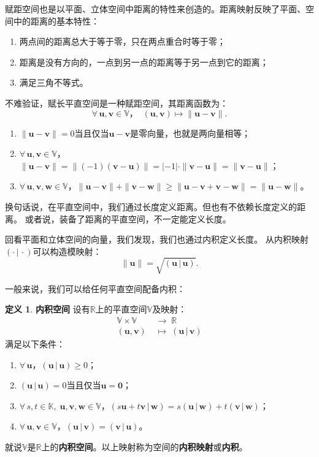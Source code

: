 \documentclass[12pt,UTF8]{ctexbook}
\newcommand{\nji}[2]{\displaystyle\left( #1 \,|\, #2\right)}
\theoremstyle{definition}
\newtheorem{df}{定义}[section]
\theoremstyle{plain}
\begin{document}
赋距空间也是以平面、立体空间中距离的特性来创造的。距离映射反映了平面、空间中的距离的基本特性：
\begin{enumerate}
    \item 两点间的距离总大于等于零，只在两点重合时等于零；
    \item 距离是没有方向的，一点到另一点的距离等于另一点到它的距离；
    \item 满足三角不等式。
\end{enumerate}

不难验证，赋长平直空间是一种赋距空间，其距离函数为：
$$ \forall \, \mathbf{u}, \mathbf{v} \in \mathbb{V}，\;\; (\mathbf{u}, \mathbf{v}) \mapsto \| \mathbf{u} - \mathbf{v} \|.$$
\begin{enumerate}
    \item $\| \mathbf{u} - \mathbf{v} \| = 0$当且仅当$\mathbf{u} - \mathbf{v}$是零向量，也就是两向量相等；
    \item $\forall \, \mathbf{u}, \mathbf{v} \in \mathbb{V}$，$\| \mathbf{u} - \mathbf{v} \| = \| (-1) (\mathbf{v} - \mathbf{u}) \| = |-1|\cdot \| \mathbf{v} - \mathbf{u} \| = \| \mathbf{v} - \mathbf{u} \|$；
    \item $\forall \, \mathbf{u}, \mathbf{v}, \mathbf{w} \in \mathbb{V}$，$\| \mathbf{u} - \mathbf{v} \| + \| \mathbf{v} - \mathbf{w} \| \geqslant \| \mathbf{u} - \mathbf{v} + \mathbf{v} - \mathbf{w}\| = \| \mathbf{u} - \mathbf{w} \|$。
\end{enumerate}

换句话说，在平直空间中，我们通过长度定义距离。但也有不依赖长度定义的距离。
或者说，装备了距离的平直空间，不一定能定义长度。

回看平面和立体空间的向量，我们发现，我们也通过内积定义长度。
从内积映射$\nji{\cdot}{\cdot}$可以构造模映射：
$$ \| \mathbf{u} \| = \sqrt{\nji{\mathbf{u}}{\mathbf{u}}}.$$

一般来说，我们可以给任何平直空间配备内积：
\begin{df}{\textbf{内积空间}}
    设有$\mathbb{R}$上的平直空间$\mathbb{V}$及映射：
    \begin{align*}
        \mathbb{V}\times \mathbb{V} \;&\rightarrow \;\mathbb{R} \\
        (\mathbf{u}, \mathbf{v}) \;&\mapsto \; \nji{\mathbf{u}}{\mathbf{v}}
    \end{align*}
    满足以下条件：
    \begin{enumerate}
        \item $\forall \, \mathbf{u}$，$\nji{\mathbf{u}}{\mathbf{u}} \geqslant 0$；
        \item $\nji{\mathbf{u}}{\mathbf{u}} = 0$当且仅当$\mathbf{u} = \mathbf{0}$；
        \item $\forall \, s, t \in \mathbb{K}, \; \mathbf{u}, \mathbf{v}, \mathbf{w}\in \mathbb{V}$，$\nji{s\mathbf{u} + t\mathbf{v}}{\mathbf{w}} = s\nji{\mathbf{u}}{\mathbf{w}} + t\nji{\mathbf{v}}{\mathbf{w}}$；
        \item $\forall \, \mathbf{u}, \mathbf{v} \in \mathbb{V}$，$\nji{\mathbf{u}}{\mathbf{v}} = \nji{\mathbf{v}}{\mathbf{u}}$。
    \end{enumerate}
    就说$\mathbb{V}$是$\mathbb{R}$上的\textbf{内积空间}。以上映射称为空间的\textbf{内积映射}或\textbf{内积}。
\end{df}
\end{document}
